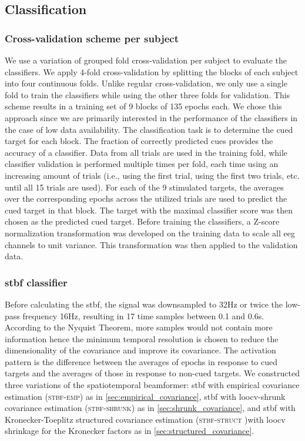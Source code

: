 	\subsection{Classification}
	\subsubsection{Cross-validation scheme per subject}
	We use a variation of grouped fold cross-validation per subject to evaluate the classifiers.
	We apply 4-fold cross-validation by splitting the blocks of each subject into
	four continuous folds.
	Unlike regular cross-validation, we only use a single fold to train the
	classifiers while using the other three folds for validation.
	This scheme results in a training set of 9 blocks of 135 epochs each.
	We chose this approach since we are primarily interested in the performance of the classifiers in the case of low data availability.
	The classification task is to determine the cued target for each block.
	The fraction of correctly predicted cues provides the accuracy of a classifier.
	Data from all trials are used in the training fold, while classifier validation
	is performed multiple times per fold, each time using an increasing amount of
	trials (i.e., using the first trial, using the first two trials, etc. until all 15 trials
	are used).
	For each of the 9 stimulated targets, the averages over the corresponding epochs across
	the utilized trials are used to predict the cued target in that block.
	The target with the maximal classifier score was then chosen as the predicted
	cued target.
	Before training the classifiers, a Z-score normalization transformation was
	developed on the training data to scale all \ac{eeg} channels to unit variance.
	This transformation was then applied to the validation data.

  \subsubsection{\Acl{stbf} classifier}
	Before calculating the \ac{stbf}, the signal was downsampled to
	32Hz or twice the low-pass frequency 16Hz, resulting in 17 time samples
	between 0.1 and 0.6s. According to the Nyquist Theorem, more samples would not
	contain more information hence the minimum temporal resolution is chosen to reduce
	the dimensionality of the covariance and improve its covariance.
	The activation pattern is the difference between the averages of epochs in response to cued targets and the averages of those in response to non-cued targets.
	We constructed three variations of the spatiotemporal beamformer:
	\ac{stbf} with empirical covariance estimation (\textsc{stbf-emp}) as in
	\cref{sec:empirical_covariance}, \ac{stbf} with
	\ac{loocv}-shrunk covariance estimation (\textsc{stbf-shrunk}) as in
	\cref{sec:shrunk_covariance}, and \ac{stbf} with
	Kronecker-Toeplitz structured covariance estimation (\textsc{stbf-struct} )with \ac{loocv} shrinkage for
	the Kronecker factors as in \cref{sec:structured_covariance}.

